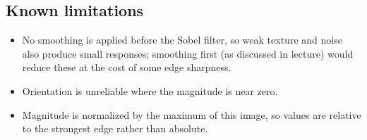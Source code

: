 \documentclass[11pt]{article}
\begin{document}
\subsection*{Known limitations}
\begin{itemize}
  \item No smoothing is applied before the Sobel filter, so weak texture and
        noise also produce small responses; smoothing first (as discussed in
        lecture) would reduce these at the cost of some edge sharpness.
  \item Orientation is unreliable where the magnitude is near zero.
  \item Magnitude is normalized by the maximum of this image, so values are
        relative to the strongest edge rather than absolute.
\end{itemize}
\end{document}
